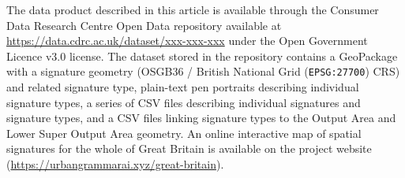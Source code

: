 
The data product described in this article is available through the Consumer Data
Research Centre Open Data repository available at
\hyperlink{https://data.cdrc.ac.uk/dataset/xxx-xxx-xxx}{https://data.cdrc.ac.uk/dataset/xxx-xxx-xxx}
under the Open Government Licence v3.0 license. The dataset stored in the repository
contains a GeoPackage with a signature geometry (OSGB36 / British National Grid
(\texttt{EPSG:27700}) CRS) and related signature type, plain-text pen portraits describing individual
signature types, a series of CSV files describing individual signatures and signature
types, and a CSV files linking signature types to the Output Area and Lower
Super Output Area geometry. An online interactive map
of spatial signatures for the whole of Great Britain is available on the project website
(\hyperlink{https://urbangrammarai.xyz/great-britain}{https://urbangrammarai.xyz/great-britain}).
